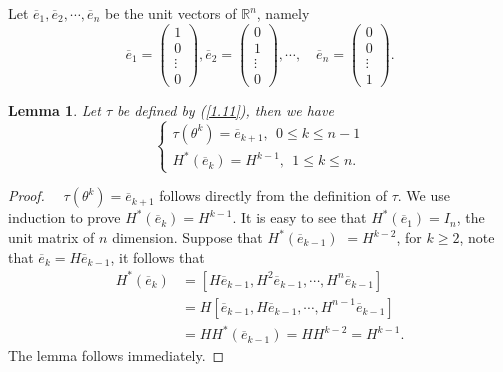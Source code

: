 \documentclass [11pt]{article}
\newtheorem{lem}[thm]{\bf Lemma}
\begin{document}
Let $\overline{e}_{1}, \overline{e}_{2}, \cdots, \overline{e}_{n}$ be the unit vectors of  $\mathbb{R}^{n}$, namely
\begin{equation}\label{2.7}
\overline{e}_{1}=\left(\begin{array}{c}
1 \\
0\\
\vdots \\
0
\end{array}\right), \overline{e}_{2}=\left(\begin{array}{l}
0 \\
1 \\
\vdots \\
0
\end{array}\right), \cdots, \quad \overline{e}_{n}=\left(\begin{array}{l}
0 \\
0 \\
\vdots \\
1
\end{array}\right) .
\end{equation}
\begin{lem}\label{lm2.1}
 Let $\tau$ be defined by (\ref{1.11}), then we have
\begin{equation}\label{2.7a}
\left\{\begin{array}{lll}
\tau\left(\theta^{k}\right)=\overline{e}_{k+1}, \ \ 0 \leq k \leq n-1 \\
H^{*}\left(\overline{e}_{k}\right)=H^{k-1}, \ \ 1 \leqslant k \leqslant n .
\end{array}\right.
\end{equation}
\end{lem}
\begin{proof}


$\quad \tau\left(\theta^{k}\right)=\overline{e}_{k+1}$ follows directly from the definition of $\tau$. We use induction to prove $H^{*}\left(\overline{e}_{k}\right)=H^{k-1}$.  It is easy to see that
$H^{*}\left(\overline{e}_{1}\right)=I_{n}$, the unit matrix of $n$ dimension.  Suppose that $H^{*}\left(\overline{e}_{k-1}\right)$ $=H^{k-2}$, for $k\geq 2$, note that $\overline{e}_{k}=H \overline{e}_{k-1}$, it follows that
\begin{align*}
H^{*}\left(\overline{e}_{k}\right)&=\left[H \overline{e}_{k-1}, H^{2} \overline{e}_{k-1}, \cdots, H^{n} \overline{e}_{k-1}\right]\\
&= H\left[ \overline{e}_{k-1}, H \overline{e}_{k-1}, \cdots, H^{n-1} \overline{e}_{k-1}\right]\\
&=HH^{*}(\overline{e}_{k-1})= HH^{k-2}=H^{k-1}.
\end{align*}
The lemma follows immediately.
\end{proof}
\end{document}
